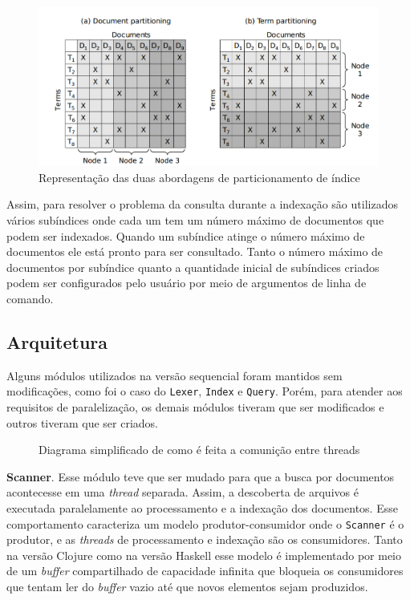 \begin{figure}[h]
 \centering
 \includegraphics[scale=0.5]{imagens/particionamento-indice.png}
 \caption{Representação das duas abordagens de particionamento de índice}
\end{figure}

Assim, para resolver o problema da consulta durante a indexação são utilizados vários subíndices onde cada um tem um número máximo de documentos que podem ser indexados. Quando um subíndice atinge o número máximo de documentos ele está pronto para ser consultado. Tanto o número máximo de documentos por subíndice quanto a quantidade inicial de subíndices criados podem ser configurados pelo usuário por meio de argumentos de linha de comando.

\subsection{Arquitetura}

Alguns módulos utilizados na versão sequencial foram mantidos sem modificações, como foi o caso do \verb|Lexer|, \verb|Index| e \verb|Query|. Porém, para atender aos requisitos de paralelização, os demais módulos tiveram que ser modificados e outros tiveram que ser criados.

\begin{figure}[h]
 \centering
 \def\svgwidth{0.6\columnwidth}
 
 \caption{Diagrama simplificado de como é feita a comunição entre threads}
\end{figure}

\textbf{Scanner}. Esse módulo teve que ser mudado para que a busca por documentos acontecesse em uma \emph{thread} separada. Assim, a descoberta de arquivos é executada paralelamente ao processamento e a indexação dos documentos. Esse comportamento caracteriza um modelo produtor-consumidor onde o \verb|Scanner| é o produtor, e as \emph{threads} de processamento e indexação são os consumidores. Tanto na versão Clojure como na versão Haskell esse modelo é implementado por meio de um \emph{buffer} compartilhado de capacidade infinita que bloqueia os consumidores que tentam ler do \emph{buffer} vazio até que novos elementos sejam produzidos.

